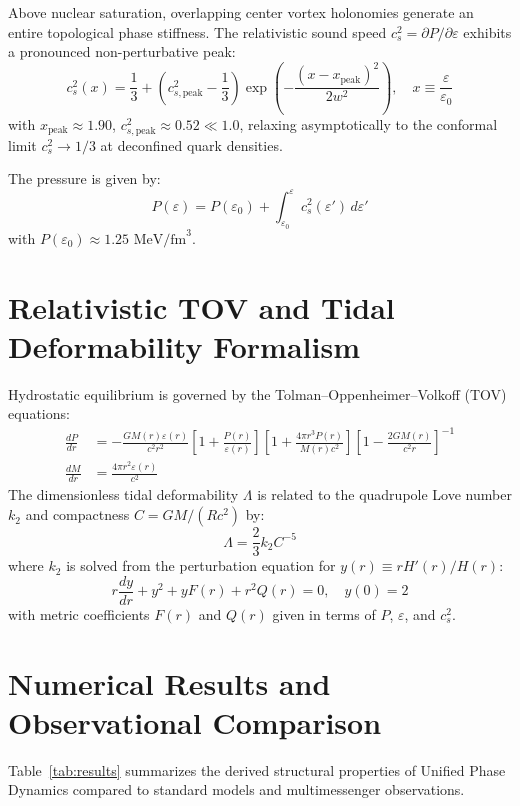 \documentclass[11pt,a4paper]{article}
\begin{document}
Above nuclear saturation, overlapping center vortex holonomies generate an entire topological phase stiffness. The relativistic sound speed $c_s^2 = \partial P / \partial \varepsilon$ exhibits a pronounced non-perturbative peak:
\begin{equation}
c_s^2(x) = \frac{1}{3} + \left(c_{s,\text{peak}}^2 - \frac{1}{3}\right) \exp\left(-\frac{(x - x_{\text{peak}})^2}{2 w^2}\right), \quad x \equiv \frac{\varepsilon}{\varepsilon_0}
\end{equation}
with $x_{\text{peak}} \approx 1.90$, $c_{s,\text{peak}}^2 \approx 0.52 \ll 1.0$, relaxing asymptotically to the conformal limit $c_s^2 \to 1/3$ at deconfined quark densities.

The pressure is given by:
\begin{equation}
P(\varepsilon) = P(\varepsilon_0) + \int_{\varepsilon_0}^\varepsilon c_s^2(\varepsilon') \, d\varepsilon'
\end{equation}
with $P(\varepsilon_0) \approx 1.25\text{ MeV/fm}^3$.

\section{Relativistic TOV and Tidal Deformability Formalism}
Hydrostatic equilibrium is governed by the Tolman--Oppenheimer--Volkoff (TOV) equations:
\begin{align}
\frac{dP}{dr} &= -\frac{G M(r) \varepsilon(r)}{c^2 r^2} \left[ 1 + \frac{P(r)}{\varepsilon(r)} \right] \left[ 1 + \frac{4\pi r^3 P(r)}{M(r)c^2} \right] \left[ 1 - \frac{2 G M(r)}{c^2 r} \right]^{-1} \\
\frac{dM}{dr} &= \frac{4\pi r^2 \varepsilon(r)}{c^2}
\end{align}
The dimensionless tidal deformability $\Lambda$ is related to the quadrupole Love number $k_2$ and compactness $C = G M / (R c^2)$ by:
\begin{equation}
\Lambda = \frac{2}{3} k_2 C^{-5}
\end{equation}
where $k_2$ is solved from the perturbation equation for $y(r) \equiv r H'(r)/H(r)$:
\begin{equation}
r \frac{dy}{dr} + y^2 + y F(r) + r^2 Q(r) = 0, \quad y(0) = 2
\end{equation}
with metric coefficients $F(r)$ and $Q(r)$ given in terms of $P$, $\varepsilon$, and $c_s^2$.

\section{Numerical Results and Observational Comparison}
Table~\ref{tab:results} summarizes the derived structural properties of Unified Phase Dynamics compared to standard models and multimessenger observations.
\end{document}
